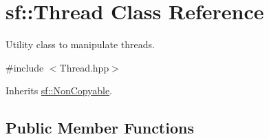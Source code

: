\hypertarget{classsf_1_1_thread}{\section{sf\+:\+:Thread Class Reference}
\label{classsf_1_1_thread}
}


Utility class to manipulate threads.  




{\ttfamily \#include $<$Thread.\+hpp$>$}



Inherits \hyperlink{classsf_1_1_non_copyable}{sf\+::\+Non\+Copyable}.

\subsection*{Public Member Functions}

